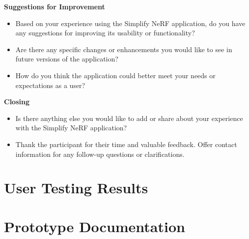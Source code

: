 \textbf{Suggestions for Improvement}
\begin{itemize}
\item Based on your experience using the Simplify NeRF application, do you have any suggestions for improving its usability or functionality?
\item Are there any specific changes or enhancements you would like to see in future versions of the application?
\item How do you think the application could better meet your needs or expectations as a user?
\end{itemize}

\textbf{Closing}
\begin{itemize}
\item Is there anything else you would like to add or share about your experience with the Simplify NeRF application?
\item Thank the participant for their time and valuable feedback.
Offer contact information for any follow-up questions or clarifications.
\end{itemize}


\section{User Testing Results}
\label{sec:appendix:testing-results}

\section{Prototype Documentation}
\label{sec:appendix:prototype-doc}

